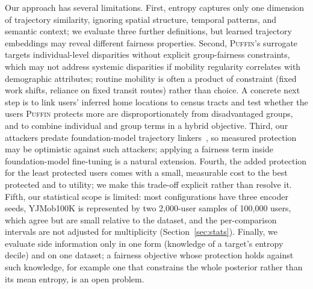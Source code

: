 \documentclass[sigconf,anonymous,review]{acmart}
\newcommand{\puffin}{\textsc{Puffin}}
\begin{document}
Our approach has several limitations. First, entropy captures only one dimension of trajectory similarity, ignoring spatial structure, temporal patterns, and semantic context; we evaluate three further definitions, but learned trajectory embeddings may reveal different fairness properties. Second, \puffin's surrogate targets individual-level disparities without explicit group-fairness constraints, which may not address systemic disparities if mobility regularity correlates with demographic attributes; routine mobility is often a product of constraint (fixed work shifts, reliance on fixed transit routes) rather than choice. A concrete next step is to link users' inferred home locations to census tracts and test whether the users \puffin{} protects more are disproportionately from disadvantaged groups, and to combine individual and group terms in a hybrid objective. Third, our attackers predate foundation-model trajectory linkers~\cite{gong2024mobilityllm}, so measured protection may be optimistic against such attackers; applying a fairness term inside foundation-model fine-tuning is a natural extension. Fourth, the added protection for the least protected users comes with a small, measurable cost to the best protected and to utility; we make this trade-off explicit rather than resolve it. Fifth, our statistical scope is limited: most configurations have three encoder seeds, YJMob100K is represented by two 2{,}000-user samples of 100{,}000 users, which agree but are small relative to the dataset, and the per-comparison intervals are not adjusted for multiplicity (Section~\ref{sec:stats}). Finally, we evaluate side information only in one form (knowledge of a target's entropy decile) and on one dataset; a fairness objective whose protection holds against such knowledge, for example one that constrains the whole posterior rather than its mean entropy, is an open problem.

\end{document}
